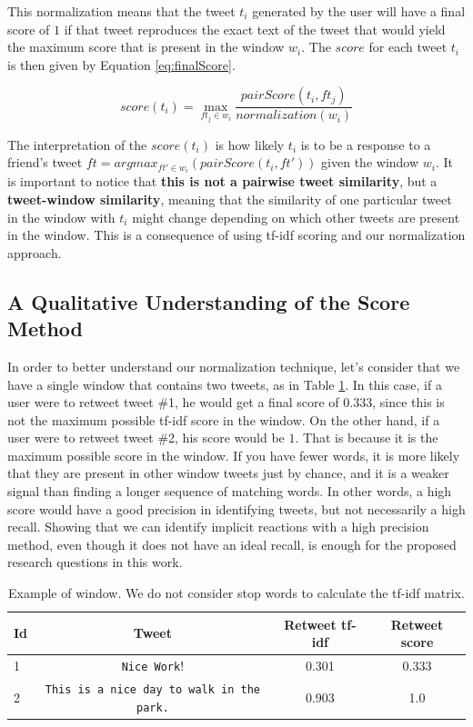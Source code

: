 This normalization means that the tweet $t_i$ generated by the user will have a final score of $1$ if that tweet reproduces the exact text of the tweet that would yield the maximum score that is present in the window $w_i$. The $score$ for each tweet $t_i$ is then given by Equation \ref{eq:finalScore}.

\begin{equation}
score(t_i) =  \max_{ft_j \in w_i}\frac{pairScore(t_i,ft_j)}{normalization(w_i)}
\label{eq:finalScore}
\end{equation}

The interpretation of the $score(t_i)$ is how likely $t_i$ is to be a response to a friend's tweet $ft = argmax_{ft' \in w_i}(pairScore(t_i,ft'))$ given the window $w_i$. It is important to notice that \textbf{this is not a pairwise tweet similarity}, but a \textbf{tweet-window similarity}, meaning that the similarity of one particular tweet in the window with $t_i$ might change depending on which other tweets are present in the window. This is a consequence of using tf-idf scoring and our normalization approach. 

\subsection{A Qualitative Understanding of the Score Method}

In order to better understand our normalization technique, let's consider that we have a single window that contains two tweets, as in Table \ref{tab:windowExample}. In this case, if a user were to retweet tweet \#1, he would get a final score of $0.333$, since this is not the maximum possible tf-idf score in the window. On the other hand, if a user were to retweet tweet \#2, his score would be $1$. That is because it is the maximum possible score in the window. If you have fewer words, it is more likely that they are present in other window tweets just by chance, and it is a weaker signal than finding a longer sequence of matching words. In other words, a high score would have a good precision in identifying tweets, but not necessarily a high recall. Showing that we can identify implicit reactions with a high precision method, even though it does not have an ideal recall, is enough for the proposed research questions in this work.

\begin{table}[!tbh]
	\fontsize{9pt}{10pt}\selectfont
	\centering
		\begin{tabular}{|l|c|c|c|}
			\hline
			Id & Tweet & Retweet tf-idf & Retweet score\\ \hline
			1 & \verb!Nice Work!! & 0.301 & 0.333 \\ \hline
			2 & \verb!This is a nice day to walk in the park.! & 0.903 & 1.0 \\ \hline
		\end{tabular}
		\caption{Example of window. We do not consider stop words to calculate the tf-idf matrix.}
	\label{tab:windowExample}
\end{table}

